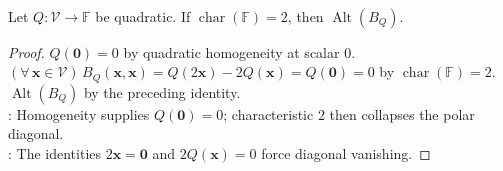 \begin{proposition} \label{prop:polar-forms-alternating-in-characteristic-two} \\
Let $Q:\mathcal{V}\to\mathbb{F}$ be quadratic. If $\operatorname{char}(\mathbb{F})=2$, then $\operatorname{Alt}(B_Q)$.
\begin{proof}
$Q(\mathbf{0})=0$ by quadratic homogeneity at scalar $0$.\\
$(\forall\,\mathbf{x}\in\mathcal{V})\,B_Q(\mathbf{x},\mathbf{x})=Q(2\mathbf{x})-2Q(\mathbf{x})=Q(\mathbf{0})=0$ by $\operatorname{char}(\mathbb{F})=2$. $\operatorname{Alt}(B_Q)$ by the preceding identity.\\
: Homogeneity supplies $Q(\mathbf{0})=0$; characteristic $2$ then collapses the polar diagonal.\\
: The identities $2\mathbf{x}=\mathbf{0}$ and $2Q(\mathbf{x})=0$ force diagonal vanishing.
\end{proof}
\end{proposition}

